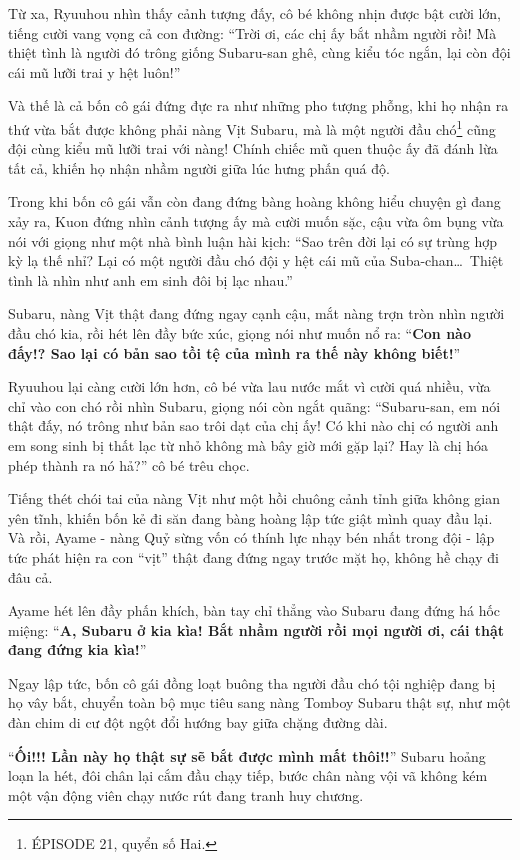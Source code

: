 \documentclass[../main.tex]{subfiles}
\begin{document}
Từ xa, Ryuuhou nhìn thấy cảnh tượng đấy, cô bé không nhịn được bật cười lớn, tiếng cười vang vọng cả con đường: ``Trời ơi, các chị ấy bắt nhầm người rồi! Mà thiệt tình là người đó trông giống Subaru-san ghê, cùng kiểu tóc ngắn, lại còn đội cái mũ lưỡi trai y hệt luôn!''

Và thế là cả bốn cô gái đứng đực ra như những pho tượng phỗng, khi họ nhận ra thứ vừa bắt được không phải nàng Vịt Subaru, mà là một người đầu chó\footnote{{\flaregothic ÉPISODE 21}, quyển số Hai.} cũng đội cùng kiểu mũ lưỡi trai với nàng! Chính chiếc mũ quen thuộc ấy đã đánh lừa tất cả, khiến họ nhận nhầm người giữa lúc hưng phấn quá độ.

Trong khi bốn cô gái vẫn còn đang đứng bàng hoàng không hiểu chuyện gì đang xảy ra, Kuon đứng nhìn cảnh tượng ấy mà cười muốn sặc, cậu vừa ôm bụng vừa nói với giọng như một nhà bình luận hài kịch: ``Sao trên đời lại có sự trùng hợp kỳ lạ thế nhỉ? Lại có một người đầu chó đội y hệt cái mũ của Suba-chan\dots\ Thiệt tình là nhìn như anh em sinh đôi bị lạc nhau.''

Subaru, nàng Vịt thật đang đứng ngay cạnh cậu, mắt nàng trợn tròn nhìn người đầu chó kia, rồi hét lên đầy bức xúc, giọng nói như muốn nổ ra: ``\textbf{Con nào đấy!? Sao lại có bản sao tồi tệ của mình ra thế này không biết!}''

Ryuuhou lại càng cười lớn hơn, cô bé vừa lau nước mắt vì cười quá nhiều, vừa chỉ vào con chó rồi nhìn Subaru, giọng nói còn ngắt quãng: ``Subaru-san, em nói thật đấy, nó trông như bản sao trôi dạt của chị ấy! Có khi nào chị có người anh em song sinh bị thất lạc từ nhỏ không mà bây giờ mới gặp lại? Hay là chị hóa phép thành ra nó hả?'' cô bé trêu chọc.

Tiếng thét chói tai của nàng Vịt như một hồi chuông cảnh tỉnh giữa không gian yên tĩnh, khiến bốn kẻ đi săn đang bàng hoàng lập tức giật mình quay đầu lại. Và rồi, Ayame - nàng Quỷ sừng vốn có thính lực nhạy bén nhất trong đội - lập tức phát hiện ra con ``vịt'' thật đang đứng ngay trước mặt họ, không hề chạy đi đâu cả.

Ayame hét lên đầy phấn khích, bàn tay chỉ thẳng vào Subaru đang đứng há hốc miệng: ``\textbf{A, Subaru ở kia kìa! Bắt nhầm người rồi mọi người ơi, cái thật đang đứng kia kìa!}''

Ngay lập tức, bốn cô gái đồng loạt buông tha người đầu chó tội nghiệp đang bị họ vây bắt, chuyển toàn bộ mục tiêu sang nàng Tomboy Subaru thật sự, như một đàn chim di cư đột ngột đổi hướng bay giữa chặng đường dài.

``\textbf{Ối!!! Lần này họ thật sự sẽ bắt được mình mất thôi!!}'' Subaru hoảng loạn la hét, đôi chân lại cắm đầu chạy tiếp, bước chân nàng vội vã không kém một vận động viên chạy nước rút đang tranh huy chương.
\end{document}
